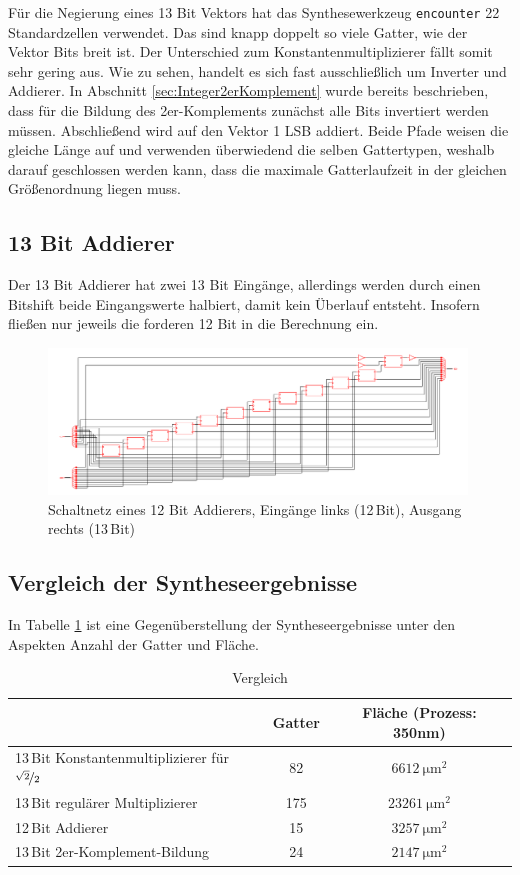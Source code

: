 Für die Negierung eines 13 Bit Vektors hat das Synthesewerkzeug \texttt{encounter} 22 Standardzellen verwendet. Das sind knapp doppelt so viele Gatter, wie der Vektor 
Bits breit ist. Der Unterschied zum Konstantenmultiplizierer fällt somit sehr gering aus. 
Wie zu sehen, handelt es sich fast ausschließlich um Inverter und Addierer. In Abschnitt \ref{sec:Integer2erKomplement} wurde bereits beschrieben, dass für die Bildung des
2er-Komplements zunächst alle Bits invertiert werden müssen. Abschließend wird auf den Vektor 1 LSB addiert. 
Beide Pfade weisen die gleiche Länge auf und verwenden überwiedend die selben
Gattertypen, weshalb darauf geschlossen werden kann, dass die maximale Gatterlaufzeit in der gleichen Größenordnung liegen muss.

\subsection{13 Bit Addierer}
Der 13 Bit Addierer hat zwei 13 Bit Eingänge, allerdings werden durch einen Bitshift beide Eingangswerte halbiert, damit kein Überlauf entsteht. Insofern fließen nur jeweils 
die forderen 12 Bit in die Berechnung ein.
\begin{figure}[htbp]
 \centering
 \includegraphics[width=0.99\textwidth]{img/13Bit_Addierer.png}
 \caption{Schaltnetz eines 12 Bit Addierers, Eingänge links (12\,Bit), Ausgang rechts (13\,Bit)}
 \label{pic:13BitAddierer}
\end{figure}

\subsection{Vergleich der Syntheseergebnisse}
 In Tabelle \ref{tab:VergleichSyntheseergebnisse} ist eine Gegenüberstellung der Syntheseergebnisse unter den Aspekten Anzahl der Gatter und Fläche.
\begin{table}[!ht]
\centering
 \caption{Vergleich}
 \label{tab:VergleichSyntheseergebnisse}
 \begin{tabular}{lcc}
 \hline
				&Gatter  	&Fläche (Prozess: 350nm) \\
  \hline	
  13\,Bit Konstantenmultiplizierer für $\nicefrac{\sqrt{2}}{2}$	& 82		& $\SI{6612}{\um^2}$ \\
  13\,Bit regulärer Multiplizierer				& 175		& $\SI{23261}{\um^2}$\\
  12\,Bit Addierer						& 15		& $\SI{3257}{\um^2}$\\
  13\,Bit 2er-Komplement-Bildung				& 24		& $\SI{2147}{\um^2}$\\
  \hline
 \end{tabular}
\end{table}



